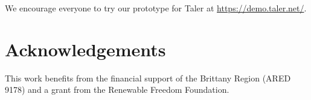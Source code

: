 \documentclass[twoside,letterpaper]{sigalternate}
\begin{document}
We encourage everyone to try our prototype for Taler
at \url{https://demo.taler.net/}.


\section*{Acknowledgements}

This work benefits from the financial support of the Brittany Region
(ARED 9178) and a grant from the Renewable Freedom Foundation.




\end{document}

